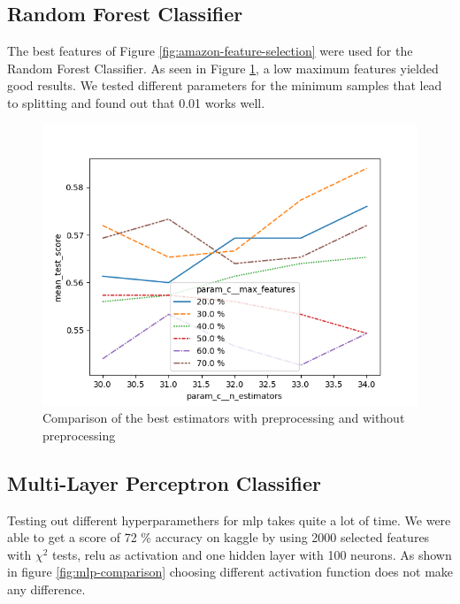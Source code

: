 \subsection{Random Forest Classifier}

The best features of Figure \ref{fig:amazon-feature-selection} were used for the Random Forest Classifier. As seen in Figure \ref{fig:amazon-rf-comparison}, a low maximum features yielded good results. We tested different parameters for the minimum samples that lead to splitting and found out that 0.01 works well.

\begin{figure}[H]
  \begin{center}
    \includegraphics[width=\linewidth]{amazon/plots/rf_comparison.png}
    \caption{Comparison of the best estimators with preprocessing and without preprocessing}
    \label{fig:amazon-rf-comparison}
  \end{center}
\end{figure}

\subsection{Multi-Layer Perceptron Classifier}

Testing out different hyperparamethers for mlp takes quite a lot of time. We were able to get a score of 72 \% accuracy on kaggle by using 2000 selected features with ${\chi}^2$ tests, relu as activation and one hidden layer with 100 neurons. As shown in figure \ref{fig:mlp-comparison} choosing different activation function does not make any difference.

